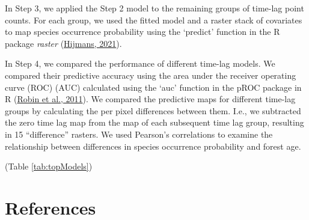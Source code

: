 \documentclass[
]{article}
\begin{document}
In Step 3, we applied the Step 2 model to the remaining groups of time-lag point counts. For each group, we used the fitted model and a raster stack of covariates to map species occurrence probability using the `predict' function in the R package \emph{raster} (\protect\hyperlink{ref-hijmansRasterGeographicData2021}{Hijmans, 2021}).

In Step 4, we compared the performance of different time-lag models. We compared their predictive accuracy using the area under the receiver operating curve (ROC) (AUC) calculated using the `auc' function in the pROC package in R (\protect\hyperlink{ref-robinPROCOpensourcePackage2011}{Robin et al., 2011}). We compared the predictive maps for different time-lag groups by calculating the per pixel differences between them. I.e., we subtracted the zero time lag map from the map of each subsequent time lag group, resulting in 15 ``difference'' rasters. We used Pearson's correlations to examine the relationship between differences in species occurrence probability and forest age.

(Table \ref{tab:topModels})

\hypertarget{references}{%
\section*{References}\label{references}}
\end{document}
